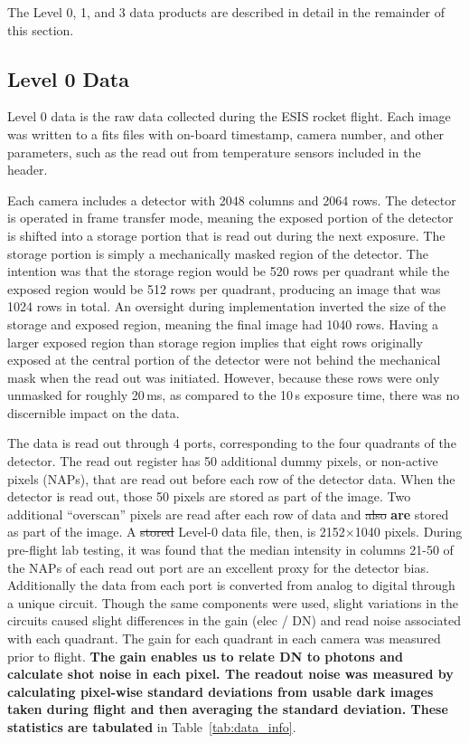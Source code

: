 The Level 0, 1, and 3 data products are described in detail in the remainder of this section. 


    
\subsection{Level 0 Data}
    
Level 0 data is the raw data collected during the ESIS rocket flight.  
Each image was written to a fits files with on-board timestamp, camera number, and other parameters, such as the read out from temperature sensors included in the header.   

Each camera includes a detector with 2048 columns and 2064 rows.  The detector is operated in frame transfer mode, meaning the exposed portion of the detector is shifted into a storage portion that is read out during the next exposure. The storage portion is simply a mechanically masked region of the detector. The intention was that the storage region would be 520 rows per quadrant while the exposed region would be 512 rows per quadrant, producing an image that was 1024 rows in total.  An oversight during implementation inverted the size of the storage and exposed region, meaning the final image had 1040 rows.  Having a larger exposed region than storage region implies that eight rows originally exposed at the central portion of the detector were not behind the mechanical mask when the read out was initiated. However, because these rows were only unmasked for roughly 20\,ms, as compared to the 10\,s exposure time, there was no discernible impact on the data. 



The data is read out through 4 ports, corresponding to the four quadrants of the detector.  The read out register has 50 additional dummy pixels, or non-active pixels (NAPs), that are read out before each row of the detector data.  When the detector is read out, those 50 pixels are stored as part of the image.  Two additional ``overscan'' pixels are read after each row of data and \sout{also} \textbf{are} stored as part of the image.  A \sout{stored} Level-0 data file, then, is 2152$\times$1040 pixels.   During pre-flight lab testing, it was found that the median intensity in columns 21-50 of the NAPs of each read out port are an excellent proxy for the detector bias.  Additionally the data from each port is converted from analog to digital through a unique circuit.  Though the same components were used, slight variations in the circuits caused slight differences in the gain (elec / DN) and read  noise associated with each quadrant.  The gain for each quadrant in each camera was measured prior to flight.  \textbf{The gain enables us to relate DN to photons and calculate shot noise in each pixel. The readout noise was measured by calculating pixel-wise standard deviations from usable dark images taken during flight and then averaging the standard deviation. These statistics are tabulated} in Table~\ref{tab:data_info}.
    
